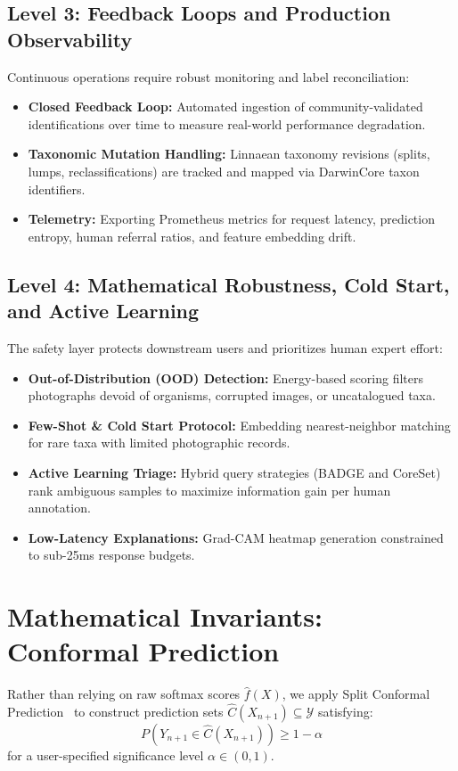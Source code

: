 \documentclass[11pt,a4paper]{article}
\begin{document}
\subsection{Level 3: Feedback Loops and Production Observability}
Continuous operations require robust monitoring and label reconciliation:
\begin{itemize}
    \item \textbf{Closed Feedback Loop:} Automated ingestion of community-validated identifications over time to measure real-world performance degradation.
    \item \textbf{Taxonomic Mutation Handling:} Linnaean taxonomy revisions (splits, lumps, reclassifications) are tracked and mapped via DarwinCore taxon identifiers.
    \item \textbf{Telemetry:} Exporting Prometheus metrics for request latency, prediction entropy, human referral ratios, and feature embedding drift.
\end{itemize}

\subsection{Level 4: Mathematical Robustness, Cold Start, and Active Learning}
The safety layer protects downstream users and prioritizes human expert effort:
\begin{itemize}
    \item \textbf{Out-of-Distribution (OOD) Detection:} Energy-based scoring filters photographs devoid of organisms, corrupted images, or uncatalogued taxa.
    \item \textbf{Few-Shot \& Cold Start Protocol:} Embedding nearest-neighbor matching for rare taxa with limited photographic records.
    \item \textbf{Active Learning Triage:} Hybrid query strategies (BADGE and CoreSet)~\cite{ren2021deepactive} rank ambiguous samples to maximize information gain per human annotation.
    \item \textbf{Low-Latency Explanations:} Grad-CAM heatmap generation constrained to sub-25ms response budgets.
\end{itemize}

\section{Mathematical Invariants: Conformal Prediction}
Rather than relying on raw softmax scores $\hat{f}(X)$, we apply Split Conformal Prediction~\cite{angelopoulos2021gentle} to construct prediction sets $\hat{C}(X_{n+1}) \subseteq \mathcal{Y}$ satisfying:
\begin{equation}
    P(Y_{n+1} \in \hat{C}(X_{n+1})) \ge 1 - \alpha
\end{equation}
for a user-specified significance level $\alpha \in (0, 1)$.
\end{document}
